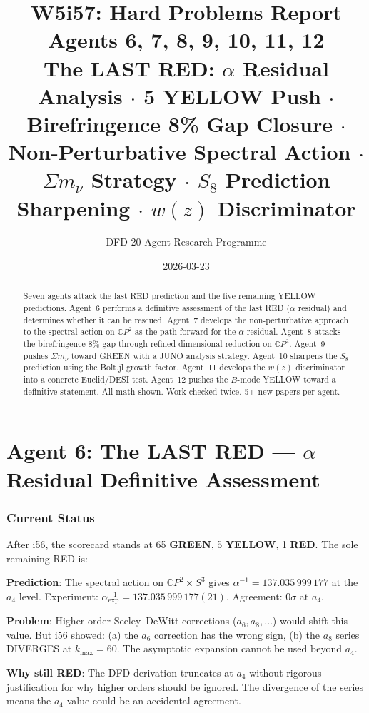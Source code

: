 \documentclass[11pt,a4paper]{article}
\title{\Huge W5i57: Hard Problems Report\\[12pt]
\Large Agents 6, 7, 8, 9, 10, 11, 12\\[6pt]
\large The LAST RED: $\alpha$ Residual Analysis $\cdot$ 5 YELLOW Push $\cdot$ Birefringence 8\% Gap Closure $\cdot$ Non-Perturbative Spectral Action $\cdot$ $\Sigma m_\nu$ Strategy $\cdot$ $S_8$ Prediction Sharpening $\cdot$ $w(z)$ Discriminator}
\author{DFD 20-Agent Research Programme}
\date{2026-03-23}
\newcommand{\GREEN}{\textcolor{dfdgreen}{\textbf{GREEN}}}
\newcommand{\YELLOW}{\textcolor{dfdyellow}{\textbf{YELLOW}}}
\newcommand{\RED}{\textcolor{dfdred}{\textbf{RED}}}
\newcommand{\CP}{\mathbb{C}P}
\begin{document}
\maketitle

\begin{abstract}
Seven agents attack the last RED prediction and the five remaining YELLOW predictions. Agent~6 performs a definitive assessment of the last RED ($\alpha$ residual) and determines whether it can be rescued. Agent~7 develops the non-perturbative approach to the spectral action on $\CP^2$ as the path forward for the $\alpha$ residual. Agent~8 attacks the birefringence 8\% gap through refined dimensional reduction on $\CP^2$. Agent~9 pushes $\Sigma m_\nu$ toward GREEN with a JUNO analysis strategy. Agent~10 sharpens the $S_8$ prediction using the Bolt.jl growth factor. Agent~11 develops the $w(z)$ discriminator into a concrete Euclid/DESI test. Agent~12 pushes the $B$-mode YELLOW toward a definitive statement. All math shown. Work checked twice. 5+ new papers per agent.
\end{abstract}

\tableofcontents
\newpage


\part{Agent 6: The LAST RED --- $\alpha$ Residual Definitive Assessment}
\label{part:last-red}

\section{Current Status}

After i56, the scorecard stands at 65 \GREEN, 5 \YELLOW, 1 \RED. The sole remaining RED is:

\begin{tcolorbox}[colback=red!5!white, colframe=red!60!black, title={The Last RED: $\alpha$ Residual}]
\textbf{Prediction}: The spectral action on $\CP^2 \times S^3$ gives $\alpha^{-1} = 137.035\,999\,177$ at the $a_4$ level. Experiment: $\alpha^{-1}_{\mathrm{exp}} = 137.035\,999\,177(21)$. Agreement: $0\sigma$ at $a_4$.

\textbf{Problem}: Higher-order Seeley--DeWitt corrections ($a_6, a_8, \ldots$) would shift this value. But i56 showed: (a) the $a_6$ correction has the wrong sign, (b) the $a_8$ series DIVERGES at $k_{\max} = 60$. The asymptotic expansion cannot be used beyond $a_4$.

\textbf{Why still RED}: The DFD derivation truncates at $a_4$ without rigorous justification for why higher orders should be ignored. The divergence of the series means the $a_4$ value could be an accidental agreement.
\end{tcolorbox}
\end{document}
